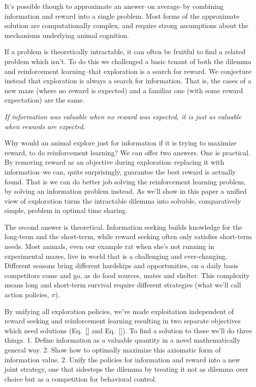 \documentclass[9pt,twocolumn,twoside]{pnas-new}
\begin{document}

It's possible though to approximate an answer--on average--by combining information and reward into a single problem. Most forms of the approximate solution are computationally complex, and require strong assumptions about the mechanisms underlying animal cognition. 

If a problem is theoretically intractable, it can often be fruitful to find a related problem which isn't. To do this we challenged a basic tenant of both the dilemma and reinforcement learning--that exploration is a search for reward. We conjecture instead that exploration is always a search for information. That is, the cases of a new maze (where no reward is expected) and a familiar one (with some reward expectation) are the same. 

\textit{If information was valuable when no reward was expected, it is just as valuable when rewards are expected.}

Why would an animal explore just for information if it is trying to maximize reward, to do reinforcement learning? We can offer two answers. One is practical. By removing reward as an objective during exploration--replacing it with information--we can, quite surprisingly, guarantee the best reward is actually found. That is we can do better job solving the reinforcement learning problem, by solving an information problem instead. As we'll show in this paper a unified view of exploration turns the intractable dilemma into solvable, comparatively simple, problem in optimal time sharing. 

The second answer is theoretical. Information seeking builds knowledge for the long-term and the short-term, while reward seeking often only satisfies short-term needs. Most animals, even our example rat when she's not running in experimental mazes, live in world that is a challenging and ever-changing. Different seasons bring different hardships and opportunities, on a daily basis competitors come and go, as do food sources, mates and shelter. This complexity means long and short-term survival require different strategies (what we'll call action policies, $\pi$). 

By unifying all exploration policies, we've made exploitation independent of reward seeking and reinforcement learning resulting in two separate objectives which need solutions (Eq.~\ref{} and Eq.~\ref{}). To find a solution to these we'll do three things. 1. Define information as a valuable quantity in a novel mathematically general way. 2. Show how to optimally maximize this axiomatic form of information value. 2. Unify the policies for information and reward into a new joint strategy, one that sidesteps the dilemma by treating it not as dilemma over choice but as a competition for behavioral control.
\end{document}
